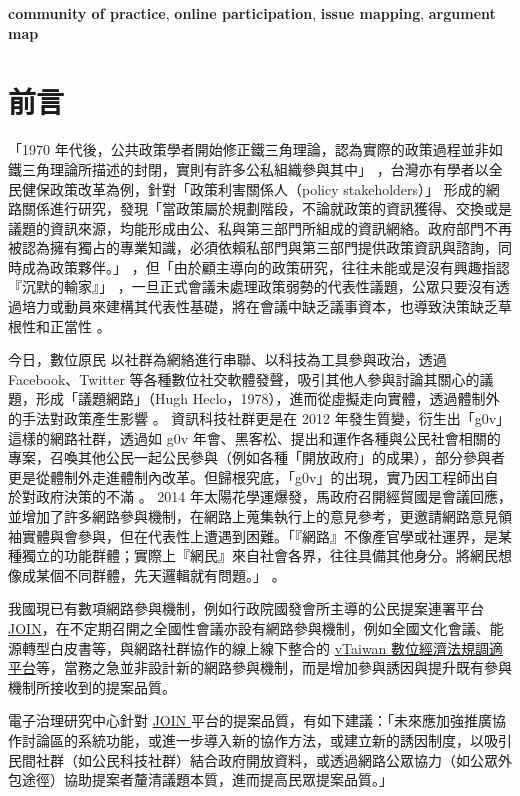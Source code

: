 \documentclass[12pt,a4paper]{article}
\begin{document}
\textbf{community of practice}, \textbf{online participation}, \textbf{issue mapping}, \textbf{argument map}
\section{前言}
\label{sec:orgf5025e0}
「1970 年代後，公共政策學者開始修正鐵三角理論，認為實際的政策過程並非如鐵三角理論所描述的封閉，實則有許多公私組織參與其中」 \citep*{luo15_gong} ，台灣亦有學者以全民健保政策改革為例，針對「政策利害關係人（policy stakeholders）」\citep{dunn94_public} 形成的網路關係進行研究，發現「當政策屬於規劃階段，不論就政策的資訊獲得、交換或是議題的資訊來源，均能形成由公、私與第三部門所組成的資訊網絡。政府部門不再被認為擁有獨占的專業知識，必須依賴私部門與第三部門提供政策資訊與諮詢，同時成為政策夥伴。」\citep{luo2005} ，但「由於顧主導向的政策研究，往往未能或是沒有興趣指認『沉默的輸家』」\citep*{chen11} ，一旦正式會議未處理政策弱勢的代表性議題，公眾只要沒有透過培力或動員來建構其代表性基礎，將在會議中缺乏議事資本，也導致決策缺乏草根性和正當性 \citep*{lo17}。

今日，數位原民 \citep*{prensky2001digital} 以社群為網絡進行串聯、以科技為工具參與政治，透過 Facebook、Twitter 等各種數位社交軟體發聲，吸引其他人參與討論其關心的議題，形成「議題網路」（Hugh Heclo，1978），進而從虛擬走向實體，透過體制外的手法對政策產生影響 \citep*{xue11_xiang} 。 資訊科技社群更是在 2012 年發生質變，衍生出「g0v」這樣的網路社群，透過如 g0v 年會、黑客松、提出和運作各種與公民社會相關的專案，召喚其他公民一起公民參與（例如各種「開放政府」的成果），部分參與者更是從體制外走進體制內改革。但歸根究底，「g0v」的出現，實乃因工程師出自於對政府決策的不滿 \citep*{zheng18} 。 2014 年太陽花學運爆發，馬政府召開經貿國是會議回應，並增加了許多網路參與機制，在網路上蒐集執行上的意見參考，更邀請網路意見領袖實體與會參與，但在代表性上遭遇到困難。「『網路』不像產官學或社運界，是某種獨立的功能群體；實際上『網民』來自社會各界，往往具備其他身分。將網民想像成某個不同群體，先天邏輯就有問題。」\citep*{albert2014} 。

我國現已有數項網路參與機制，例如行政院國發會所主導的公民提案連署平台 \href{https://join.gov.tw}{JOIN}，在不定期召開之全國性會議亦設有網路參與機制，例如全國文化會議、能源轉型白皮書等，與網路社群協作的線上線下整合的 \href{https://vtaiwan.tw/}{vTaiwan 數位經濟法規調適平台}等，當務之急並非設計新的網路參與機制，而是增加參與誘因與提升既有參與機制所接收到的提案品質。

電子治理研究中心針對 \href{https://join.gov.tw}{JOIN }平台的提案品質，有如下建議：「未來應加強推廣協作討論區的系統功能，或進一步導入新的協作方法，或建立新的誘因制度，以吸引民間社群（如公民科技社群）結合政府開放資料，或透過網路公眾協力（如公眾外包途徑）協助提案者釐清議題本質，進而提高民眾提案品質。」\citep{liao18}
\end{document}
